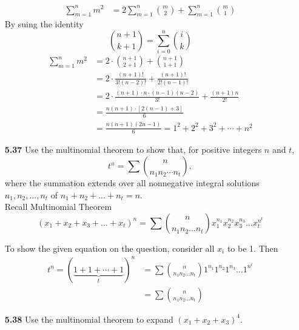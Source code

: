 \documentclass[12pt]{article}
\begin{document}
\begin{enumerate}
    \begin{align*}
        \sum\limits_{m=1}^n m^2&=
            2\sum\limits_{m=1}^n\binom{m}{2} + \sum\limits_{m=1}^n\binom{m}{1}
    \end{align*}
    By suing the identity
    $$\binom{n+1}{k+1} = \sum\limits_{i=0}^n \binom{i}{k}$$
    \begin{align*}
        \sum\limits_{m=1}^n m^2&= 2\cdot\binom{n+1}{2+1} + \binom{n+1}{1+1}\\
        &= 2\cdot\frac{(n+1)!}{3!(n-2)!} + \frac{(n+1)!}{2!(n-1)!} \\
        &=2\cdot \frac{(n+1)\cdot n\cdot(n-1)(n-2)}{3!} +\frac{(n+1)n}{2!}\\
        &= \frac{n(n+1)\cdot[2(n-1)+3]}{6} \\
        &=\frac{n(n+1)(2n-1)}{6} = 1^2+2^2+3^2+\dotsb+n^2
    \end{align*}
    
    \newpage
    \item[\bf 5.37] Use the multinomial theorem to show that, for positive integers $n$ and $t$,
    $$t^n=\sum\binom{n}{n_1n_2\dotsb n_t},$$
    where the summation extends over all nonnegative integral solutions $n_1,n_2,...,n_t$ of $n_1+n_2+...+n_t=n$.\\
    
    Recall Multinomial Theorem 
    $$(x_1+x_2+x_3+...+x_t)^n = \sum\binom{n}{n_1n_2\ldots n_t}x_1^{n_1}x_2^{n_2}x_3^{n_3}\ldots x_t^{n^t}$$
    
    To show the given equation on the question, consider all $x_i$ to be 1. Then
    \begin{align*}
    t^n = (\underbrace{1+1+\dotsb+1}_t)^n &= \sum\binom{n}{n_1n_2\ldots n_t}1^{n_1}1^{n_2}1^{n_3}\ldots 1^{n^t}\\
    &=\sum\binom{n}{n_1n_2\ldots n_t}
    \end{align*}
    
    \newpage
    \item[\bf 5.38] Use the multinomial theorem to expand $(x_1+x_2+x_3)^4$.\\
    

\end{enumerate}
\end{document}
